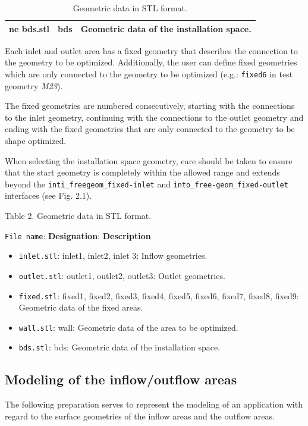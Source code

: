 \documentclass[oneside]{article}
\numberwithin{equation}{section}
\numberwithin{figure}{section}
\numberwithin{figure}{section}
\begin{document}
\begin{table}[h]
\begin{tabular}{|p{1.3cm}|p{5.1cm}|p{4cm}|}
ne
        bds.stl &  bds & Geometric data of the installation space.\\
        \hline
    \end{tabular}
    \caption{Geometric data in STL format.}\label{tab:stlDaten2}
\end{table}
Each inlet and outlet area has a fixed geometry that describes the connection to the geometry to be optimized. Additionally, the user can define fixed geometries which are only connected to the geometry to be optimized (e.g.: \texttt{fixed6} in test geometry \textit{M23}).

The fixed geometries are numbered consecutively, starting with the connections to the inlet geometry, continuing with the connections to the outlet geometry and ending with the fixed geometries that are only connected to the geometry to be shape optimized.

When selecting the installation space geometry, care should be taken to ensure that the start geometry is completely within the allowed range and extends beyond the \verb|inti_freegeom_fixed-inlet| and \verb|into_free-geom_fixed-outlet| interfaces (see Fig. 2.1).

\textsf{Table 2. Geometric data in STL format.}

\texttt{File name}: \textbf{Designation}: \textbf{Description}
\begin{itemize}
    \item \texttt{inlet.stl}: inlet1, inlet2, inlet 3: Inflow geometries.
    \item \texttt{outlet.stl}: outlet1, outlet2, outlet3: Outlet geometries.
    \item \texttt{fixed.stl}: fixed1, fixed2, fixed3, fixed4, fixed5, fixed6, fixed7, fixed8, fixed9: Geometric data of the fixed areas.
    \item \texttt{wall.stl}: wall: Geometric data of the area to be optimized.
    \item \texttt{bds.stl}: bds: Geometric data of the installation space.
\end{itemize}

\subsection{Modeling of the inflow/outflow areas}
The following preparation serves to represent the modeling of an application with regard to the surface geometries of the inflow areas and the outflow areas.
\end{document}
